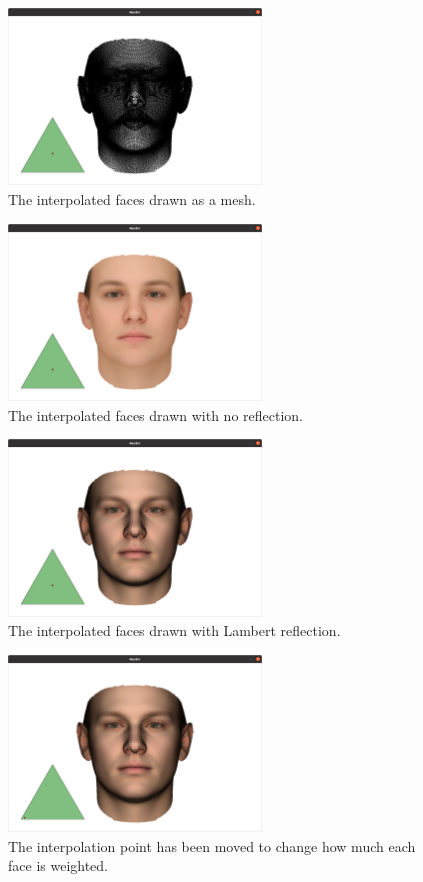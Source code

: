 \documentclass{article}
\begin{document}
\begin{figure}[htb]
    \centering
    \includegraphics[width=0.6\textwidth]{./images/mesh.png}    
    \caption{The interpolated faces drawn as a mesh.}
    \label{fig:mesh}
\end{figure}
\begin{figure}[htb]
    \centering
    \includegraphics[width=0.6\textwidth]{./images/none.png}
    \caption{The interpolated faces drawn with no reflection.}
    \label{fig:label}
\end{figure}
\begin{figure}[htb]
    \centering
    \includegraphics[width=0.6\textwidth]{./images/lambert.png}
    \caption{The interpolated faces drawn with Lambert reflection.}
    \label{fig:label}
\end{figure}
\begin{figure}[htb]
    \centering
    \includegraphics[width=0.6\textwidth]{./images/moved.png}
    \caption{The interpolation point has been moved 
    to change how much each face is weighted. }
    \label{fig:label}
\end{figure}
\end{document}

